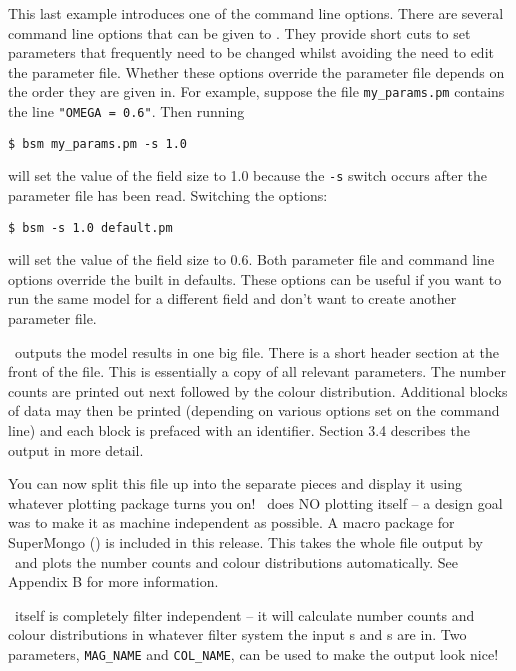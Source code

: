 \documentclass[11pt,twoside]{article}
\begin{document}
This last example introduces one of the command line options.
There are several command line options that can be given to \bsm. They provide
short cuts to set parameters that frequently need to be changed whilst avoiding
the need to edit the parameter file. Whether these options override the 
parameter file depends on the order they are given in. For example, suppose
the file {\tt my\_params.pm} contains the line {\tt "OMEGA = 0.6"}. Then 
running
\begin{verbatim}
$ bsm my_params.pm -s 1.0
\end{verbatim}
will set the value of the field size to 1.0 because the {\tt -s} switch occurs
after the parameter file has been read. Switching the options:
\begin{verbatim}
$ bsm -s 1.0 default.pm
\end{verbatim}
will set the value of the field size to 0.6. Both parameter file and command 
line options override the built in defaults. These options can be useful if 
you want to run the same model for a different field and don't want to create 
another parameter file.

\bsm\ outputs the model results in one big file.
There is a short header section at the front of the file. This is
essentially a copy of all relevant parameters. The number counts are printed  
out next followed by the colour distribution. Additional blocks of data may 
then be printed (depending on various options set on the command line) and
each block is prefaced with an identifier. Section 3.4 describes the output
in more detail.

You can now split this file up into the separate pieces and display it using
whatever plotting package turns you on! \bsm\ does NO plotting itself -- a
design goal was to make it as machine independent as possible.
A macro package for SuperMongo (\sm) is included in this release. This
takes the whole file output by \bsm\ and plots the number counts and
colour distributions automatically. See Appendix B for more information.
 
\bsm\ itself is completely filter independent -- it will calculate number
counts and colour distributions in whatever filter system the input \lf s
and \cmd s are in. Two parameters, {\tt MAG\_NAME} and {\tt COL\_NAME}, can
be used to make the output look nice!

\newpage
\end{document}
